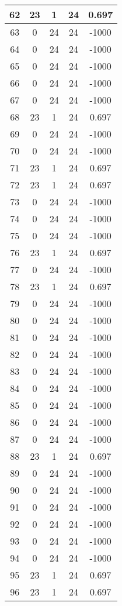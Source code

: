 \documentclass[letterpaper, 12pt]{article}
\begin{document}
\begin{longtable}{|c|c|c|c|c|}
\hline
62 & 23 & 1 & 24 & 0.697 \\
\hline
63 & 0 & 24 & 24 & -1000 \\
\hline
64 & 0 & 24 & 24 & -1000 \\
\hline
65 & 0 & 24 & 24 & -1000 \\
\hline
66 & 0 & 24 & 24 & -1000 \\
\hline
67 & 0 & 24 & 24 & -1000 \\
\hline
68 & 23 & 1 & 24 & 0.697 \\
\hline
69 & 0 & 24 & 24 & -1000 \\
\hline
70 & 0 & 24 & 24 & -1000 \\
\hline
71 & 23 & 1 & 24 & 0.697 \\
\hline
72 & 23 & 1 & 24 & 0.697 \\
\hline
73 & 0 & 24 & 24 & -1000 \\
\hline
74 & 0 & 24 & 24 & -1000 \\
\hline
75 & 0 & 24 & 24 & -1000 \\
\hline
76 & 23 & 1 & 24 & 0.697 \\
\hline
77 & 0 & 24 & 24 & -1000 \\
\hline
78 & 23 & 1 & 24 & 0.697 \\
\hline
79 & 0 & 24 & 24 & -1000 \\
\hline
80 & 0 & 24 & 24 & -1000 \\
\hline
81 & 0 & 24 & 24 & -1000 \\
\hline
82 & 0 & 24 & 24 & -1000 \\
\hline
83 & 0 & 24 & 24 & -1000 \\
\hline
84 & 0 & 24 & 24 & -1000 \\
\hline
85 & 0 & 24 & 24 & -1000 \\
\hline
86 & 0 & 24 & 24 & -1000 \\
\hline
87 & 0 & 24 & 24 & -1000 \\
\hline
88 & 23 & 1 & 24 & 0.697 \\
\hline
89 & 0 & 24 & 24 & -1000 \\
\hline
90 & 0 & 24 & 24 & -1000 \\
\hline
91 & 0 & 24 & 24 & -1000 \\
\hline
92 & 0 & 24 & 24 & -1000 \\
\hline
93 & 0 & 24 & 24 & -1000 \\
\hline
94 & 0 & 24 & 24 & -1000 \\
\hline
95 & 23 & 1 & 24 & 0.697 \\
\hline
96 & 23 & 1 & 24 & 0.697 \\

\end{longtable}
\end{document}
